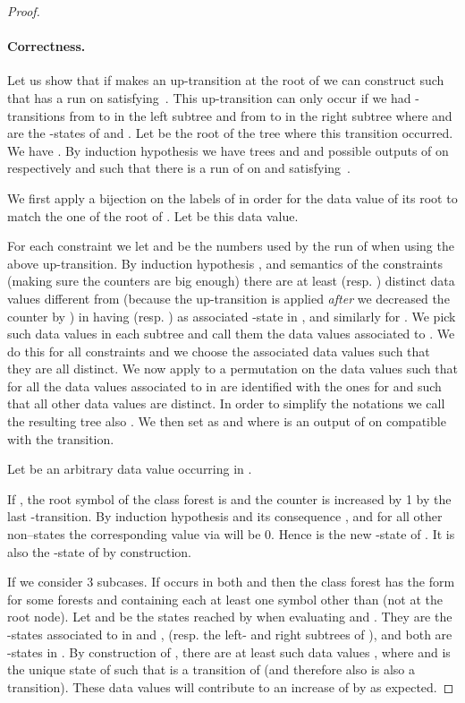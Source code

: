 \documentclass{CSML}
\newcommand\rootstate{-state\xspace}
\begin{document}
\begin{proof}
\paragraph{\bf Correctness.} 
Let us show that if  makes an up-transition   
at the root of  we can construct  such that 
has a run on  satisfying~.
This up-transition can only occur if we had -transitions from  to
 in the left subtree and from  to
 in the right subtree where  and  are the
-states of  and .
Let  be the root of the tree  where this transition
occurred. We have . 
By induction hypothesis we have trees
 and  
and possible outputs  of  
on respectively  and  
such that there is a run of  on 
 and  satisfying~.

We first apply a bijection on the labels of  in order for the data
value of its root to match the one of the root of . Let  be this
data value.

For each constraint  
we let  and  be the numbers used by the run of  when using
the above up-transition.  By induction hypothesis , and semantics of the
constraints (making sure the counters are big enough) there are at least
 (resp. ) distinct data values different from 
(because the up-transition is applied \emph{after} we decreased the counter  by ) 
in  having  (resp. ) as associated
-state in , 
and similarly for .  
We pick such data values in each subtree 
and call them the data values associated to .  
We do this for all constraints  
and we choose the associated data values such that they are all distinct.  
We now apply to  a permutation on the data values 
such that for all  the data values associated to  in  
are identified with the ones for  and such that all other
data values are distinct.  In order to simplify the notations we call the
resulting tree also .  We then set  as 
and  where  
is an output of  on  compatible with the transition.

Let  be an arbitrary data value occurring in .

If , the root symbol of the class forest  
is  and the counter  is increased by 1 by the last -transition.
By induction hypothesis and its consequence , 
 and for all other non--states 
the corresponding value via  will be 0. 
Hence  is the new \rootstate of . 
It is also the \rootstate of  by construction.

If  we consider 3 subcases. 
If  occurs in both  and  
then the class forest  has the form  
for some forests  and 
containing each at least one symbol other than  (not at the root node).
Let  and  be the states reached by  when evaluating  and .
They are the -states associated to  in  and ,
(resp. the left- and right subtrees of ),
and both are -states in .
By construction of , there are at least
 such data values , 
where  
and  is the unique state of  such that 
 is a transition of  (and
therefore also  is also a transition). 
These  data values will contribute to an increase of  by  as expected.


\end{proof}
\end{document}
